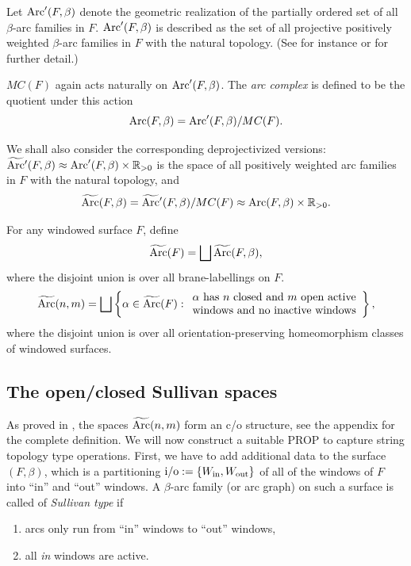 \documentclass[pdftex]{sigma}
\begin{document}
Let ${\rm Arc}'(F,\beta )$ denote the geometric realization of the partially
ordered set of all $\beta$-arc families in $F$.  ${\rm Arc}'(F,\beta )$ is
described as the set of all projective positively weighted $\beta$-arc
families in $F$ with the natural topology. (See for instance \cite{KLP} or \cite{P1} for
further detail.)

$MC(F)$ again
acts naturally on ${\rm Arc}'(F,\beta )$.  The {\it arc
complex} is def\/ined to be the  quotient under this action
\[
{\rm Arc}(F,\beta )={\rm Arc}'(F,\beta )/MC(F).
\]

We shall also consider the corresponding deprojectivized versions:
$\widetilde{\rm Arc}{}'(F,\beta )\approx {\rm Arc}'(F,\beta )\times{\mathbb R}_{>0}$ is the space of all positively weighted arc
families in $F$ with the natural topology, and
\[
\widetilde{\rm Arc}(F,\beta )=\widetilde{\rm Arc}{}'(F,\beta )/MC(F)\approx
{\rm Arc}(F,\beta )\times{\mathbb R}_{>0}.
\]



For any windowed surface $F$, def\/ine
\[
\widetilde{\rm Arc}(F)=\bigsqcup \widetilde{\rm Arc}(F,\beta),
\]
where the disjoint union is over all brane-labellings on $F$.
\[
\widetilde{\rm Arc}(n,m)=\bigsqcup \left\{ \alpha\in \widetilde{\rm Arc}(F):
\begin{array}{l}\alpha ~{\rm has}~n~{\rm closed~and}~ m~{\rm
open~active}\\{\rm
windows~and~no~inactive~windows}\end{array}\right\},
\] where the
disjoint union is over all orientation-preserving
homeomorphism classes of windowed surfaces.




\subsection{The open/closed Sullivan spaces}
As proved in \cite{KP}, the spaces $\widetilde{\rm Arc}(n,m)$ form an
c/o structure, see the appendix for the complete def\/inition. We will
now construct a suitable PROP to capture string topology type
operations. First, we have to add additional data to the surface
$(F,\beta)$, which is a partitioning ${\rm i/o} :=\{W_{\rm in},W_{\rm out}\}$ of
all of the windows of $F$ into ``in'' and  ``out'' windows. A
$\beta$-arc  family (or arc graph) on such a surface is called of
{\em Sullivan type} if
\begin{enumerate}\itemsep=0pt
\item arcs only run from ``in'' windows to ``out'' windows,
\item all {\em in} windows are active.
\end{enumerate}
\end{document}
